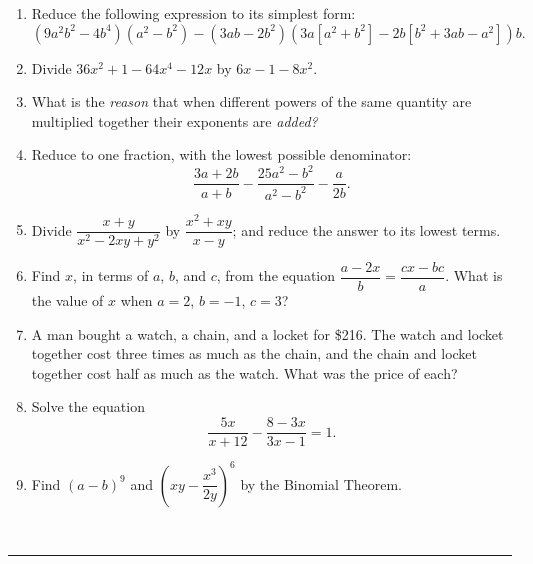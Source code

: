 \documentclass[11pt]{article}
\begin{document}
\begin{enumerate}[series=algebra, itemindent=-0.2cm]

    \item Reduce the following expression to its simplest form: 
    \[
    (9a^2b^2 - 4b^4)(a^2 - b^2) - (3ab - 2b^2)(3a[a^2 + b^2] - 2b[b^2 + 3ab - a^2])b.
    \]
    \vfill

    \item Divide $36x^2 + 1 - 64x^4 - 12x$ by $6x - 1 - 8x^2$. \vfill
    
    \item What is the \textit{reason} that when different powers of the same quantity are multiplied together their exponents are \textit{added?} \vfill
    
    \item Reduce to one fraction, with the lowest possible denominator:
    \[
    \frac{3a + 2b}{a + b} - \frac{25a^2 - b^2}{a^2 - b^2} - \frac{a}{2b}.
    \]
    \vfill
    
    \item Divide $\dfrac{x + y}{x^2 - 2xy + y^2}$ by $\dfrac{x^2 + xy}{x - y}$; and reduce the answer to its lowest terms. \vfill
    
    \item Find $x$, in terms of $a$, $b$, and $c$, from the equation $\dfrac{a - 2x}{b} = \dfrac{cx - bc}{a}$. What is the value of $x$ when $a = 2$, $b = -1$, $c = 3$? \vfill
    
    \item A man bought a watch, a chain, and a locket for \$216. The watch and locket together cost three times as much as the chain, and the chain and locket together cost half as much as the watch. What was the price of each? \vfill
    
    \item Solve the equation
    \[  
    \frac{5x}{x + 12} - \frac{8 - 3x}{3x - 1} = 1.
    \] 
    \vfill
    
    \item Find $(a - b)^9$ and $\left(xy - \dfrac{x^3}{2y}\right)^6$ by the Binomial Theorem. \vfill

\end{enumerate}

\newpage

\begin{center}
     \\ \vspace{12pt}
    \rule{2cm}{0.4pt} \\ \vspace{12pt}
\end{center}
\end{document}
